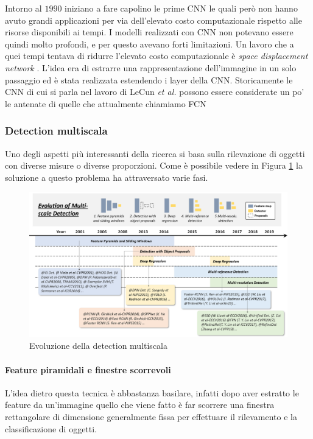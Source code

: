 Intorno al $1990$ iniziano a fare capolino le prime \ac{CNN} \cite{vaillant1994original} le quali però non hanno avuto grandi applicazioni per via dell'elevato costo computazionale rispetto alle risorse disponibili ai tempi. I modelli realizzati con \ac{CNN} non potevano essere quindi molto profondi, e per questo avevano forti limitazioni. Un lavoro che a quei tempi tentava di ridurre l'elevato costo computazionale è \textit{space displacement network} \cite{lecun1998gradient}. L'idea era di estrarre una rappresentazione dell'immagine in un solo passaggio ed è stata realizzata estendendo i layer della \ac{CNN}. Storicamente le \ac{CNN} di cui si parla nel lavoro di LeCun \textit{et al.} possono essere considerate un po' le antenate di quelle che attualmente chiamiamo \ac{FCN} \cite{long2015fully} \cite{chen2014semantic}
\subsubsection{Detection multiscala}
\label{subsec:multiscale_detection}
Uno degli aspetti più interessanti della ricerca si basa sulla rilevazione di oggetti con diverse misure o diverse proporzioni. Come è possibile vedere in Figura \ref{fig:multi_scale_history} la soluzione a questo problema ha attraversato varie fasi.
\begin{figure}
    \centering
    \includegraphics[width=\textwidth]{images/evol-multiscale.png}
    \caption{Evoluzione della detection multiscala \cite{DBLP:journals/corr/abs-1905-05055}}
    \label{fig:multi_scale_history}
\end{figure}
\paragraph{Feature piramidali e finestre scorrevoli}
L'idea dietro questa tecnica è abbastanza basilare, infatti dopo aver estratto le feature da un'immagine quello che viene fatto è far scorrere una finestra rettangolare di dimensione generalmente fissa per effettuare il rilevamento e la classificazione di oggetti. 

